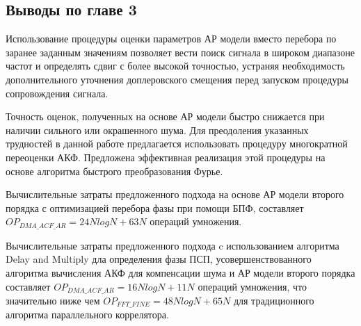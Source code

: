 \subsection*{Выводы по главе 3}

Использование процедуры оценки параметров АР модели вместо перебора по заранее заданным значениям позволяет вести поиск сигнала
в широком диапазоне частот и определять сдвиг с более высокой точностью, устраняя необходимость дополнительного уточнения
доплеровского смещения перед запуском процедуры сопровождения сигнала.

Точность оценок, полученных на основе АР модели быстро снижается при наличии сильного или окрашенного шума. Для преодоления указанных
трудностей в данной работе предлагается использовать процедуру многократной переоценки АКФ. Предложена эффективная реализация
этой процедуры на основе алгоритма быстрого преобразования Фурье.

Вычислительные затраты предложенного подхода на основе АР модели второго порядка с оптимизацией перебора фазы при помощи БПФ,
составляет ${OP_{DMA\_ACF\_AR}=24NlogN+63N}$ операций умножения.

Вычислительные затраты предложенного подхода c использованием алгоритма Delay and Multiply дла определения фазы ПСП,
усовершенствованного алгоритма вычисления АКФ для компенсации шума и АР модели второго порядка составляет ${OP_{DMA\_ACF\_AR}=16NlogN+11N}$
операций умножения, что значительно ниже чем ${OP_{FFT\_FINE}=48NlogN+65N}$ для традиционного алгоритма параллельного коррелятора.

\newpage
